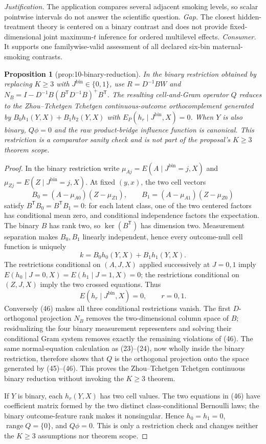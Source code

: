 \documentclass{article}
\newtheorem{proposition}{Proposition}
\begin{document}
\par\smallskip\noindent \textit{Justification.} The application compares several adjacent smoking levels, so scalar pointwise intervals do not answer the scientific question. \textit{Gap.} The closest hidden-treatment theory is centered on a binary contrast and does not provide fixed-dimensional joint maximum-\(t\) inference for ordered multilevel effects. \textit{Consumer.} It supports one familywise-valid assessment of all declared six-bin maternal-smoking contrasts.

\begin{proposition}[prop:10-binary-reduction]\label{prop:10-binary-reduction}
In the binary restriction obtained by replacing \(K\geq3\) with \(J^{\mathrm{bin}}\in\{0,1\}\), use \(R=D^{-1}BW\) and \(N_B=I-D^{-1}B(B^{\mathsf T}D^{-1}B)^{+}B^{\mathsf T}\). The resulting cell-and-Gram operator \(Q\) reduces to the Zhou--Tchetgen Tchetgen continuous-outcome orthocomplement generated by \(B_0h_1(Y,X)+B_1h_2(Y,X)\) with \(E_P(h_r\mid J^{\mathrm{bin}},X)=0\). When \(Y\) is also binary, \(Q\phi=0\) and the raw product-bridge influence function is canonical. This restriction is a comparator sanity check and is not part of the proposal's \(K\geq3\) theorem scope.
\end{proposition}
\begin{proof}
In the binary restriction write \(\mu_{Aj}=E(A\mid J^{\mathrm{bin}}=j,X)\) and \(\mu_{Zj}=E(Z\mid J^{\mathrm{bin}}=j,X)\).  At fixed \((y,x)\), the two cell vectors
\[
B_0=(A-\mu_{A0})(Z-\mu_{Z1}),\qquad
B_1=(A-\mu_{A1})(Z-\mu_{Z0})
\]
satisfy \(B^{\mathsf T}B_0=B^{\mathsf T}B_1=0\): for each latent class, one of the two centered factors has conditional mean zero, and conditional independence factors the expectation.  The binary \(B\) has rank two, so \(\ker(B^{\mathsf T})\) has dimension two.  Measurement separation makes \(B_0,B_1\) linearly independent, hence every outcome-null cell function is uniquely
\[
k=B_0h_0(Y,X)+B_1h_1(Y,X). \tag{45}
\]
The restrictions conditional on \((A,J,X)\) applied successively at \(J=0,1\) imply \(E(h_0\mid J=0,X)=E(h_1\mid J=1,X)=0\); the restrictions conditional on \((Z,J,X)\) imply the two crossed equations.  Thus
\[
E(h_r\mid J^{\mathrm{bin}},X)=0,\qquad r=0,1. \tag{46}
\]
Conversely (46) makes all three conditional restrictions vanish.  The first \(D\)-orthogonal projection \(N_B\) removes the two-dimensional column space of \(B\); residualizing the four binary measurement representers and solving their conditional Gram system removes exactly the remaining violations of (46).  The same normal-equation calculation as (23)--(24), now wholly inside the binary restriction, therefore shows that \(Q\) is the orthogonal projection onto the space generated by (45)--(46).  This proves the Zhou--Tchetgen Tchetgen continuous binary reduction without invoking the \(K\geq3\) theorem.

If \(Y\) is binary, each \(h_r(Y,X)\) has two cell values.  The two equations in (46) have coefficient matrix formed by the two distinct class-conditional Bernoulli laws; the binary outcome-feature rank makes it nonsingular.  Hence \(h_0=h_1=0\), \(\operatorname{range}Q=\{0\}\), and \(Q\phi=0\).  This is only a restriction check and changes neither the \(K\ge3\) assumptions nor theorem scope.
\end{proof}
\end{document}
